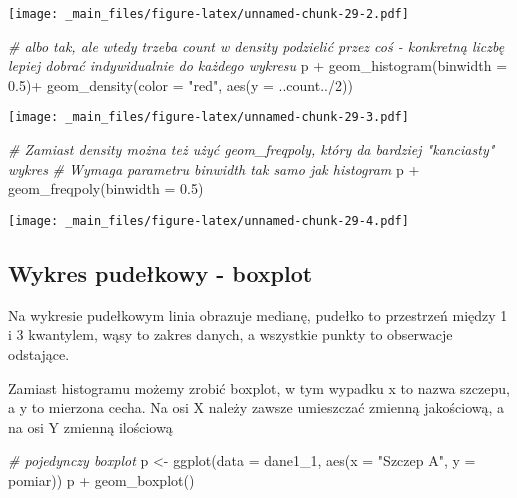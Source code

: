 \documentclass[
]{book}
\newenvironment{Shaded}{\begin{snugshade}}{\end{snugshade}}
\newcommand{\AttributeTok}[1]{\textcolor[rgb]{0.77,0.63,0.00}{#1}}
\newcommand{\CommentTok}[1]{\textcolor[rgb]{0.56,0.35,0.01}{\textit{#1}}}
\newcommand{\DecValTok}[1]{\textcolor[rgb]{0.00,0.00,0.81}{#1}}
\newcommand{\FloatTok}[1]{\textcolor[rgb]{0.00,0.00,0.81}{#1}}
\newcommand{\FunctionTok}[1]{\textcolor[rgb]{0.00,0.00,0.00}{#1}}
\newcommand{\NormalTok}[1]{#1}
\newcommand{\OtherTok}[1]{\textcolor[rgb]{0.56,0.35,0.01}{#1}}
\newcommand{\SpecialCharTok}[1]{\textcolor[rgb]{0.00,0.00,0.00}{#1}}
\newcommand{\StringTok}[1]{\textcolor[rgb]{0.31,0.60,0.02}{#1}}
\begin{document}
\texttt{[image: \_main\_files/figure-latex/unnamed-chunk-29-2.pdf]}

\begin{Shaded}
\begin{Highlighting}[]
\CommentTok{\# albo tak, ale wtedy trzeba count w density podzielić przez coś {-} konkretną liczbę lepiej dobrać indywidualnie do każdego wykresu}
\NormalTok{p }\SpecialCharTok{+} \FunctionTok{geom\_histogram}\NormalTok{(}\AttributeTok{binwidth =} \FloatTok{0.5}\NormalTok{)}\SpecialCharTok{+}
  \FunctionTok{geom\_density}\NormalTok{(}\AttributeTok{color =} \StringTok{"red"}\NormalTok{, }\FunctionTok{aes}\NormalTok{(}\AttributeTok{y =}\NormalTok{ ..count..}\SpecialCharTok{/}\DecValTok{2}\NormalTok{))}
\end{Highlighting}
\end{Shaded}

\texttt{[image: \_main\_files/figure-latex/unnamed-chunk-29-3.pdf]}

\begin{Shaded}
\begin{Highlighting}[]
\CommentTok{\# Zamiast density można też użyć geom\_freqpoly, który da bardziej "kanciasty" wykres}
\CommentTok{\# Wymaga parametru binwidth tak samo jak histogram}
\NormalTok{p }\SpecialCharTok{+} \FunctionTok{geom\_freqpoly}\NormalTok{(}\AttributeTok{binwidth =} \FloatTok{0.5}\NormalTok{)}
\end{Highlighting}
\end{Shaded}

\texttt{[image: \_main\_files/figure-latex/unnamed-chunk-29-4.pdf]}

\hypertarget{wykres-pudeux142kowy---boxplot}{%
\subsection{Wykres pudełkowy - boxplot}\label{wykres-pudeux142kowy---boxplot}}

Na wykresie pudełkowym linia obrazuje medianę, pudełko to przestrzeń między 1 i 3 kwantylem, wąsy to zakres danych, a wszystkie punkty to obserwacje odstające.

Zamiast histogramu możemy zrobić boxplot, w tym wypadku x to nazwa szczepu, a y to mierzona cecha. Na osi X należy zawsze umieszczać zmienną jakościową, a na osi Y zmienną ilościową

\begin{Shaded}
\begin{Highlighting}[]
\CommentTok{\# pojedynczy boxplot}
\NormalTok{p }\OtherTok{\textless{}{-}} \FunctionTok{ggplot}\NormalTok{(}\AttributeTok{data =}\NormalTok{ dane1\_1, }\FunctionTok{aes}\NormalTok{(}\AttributeTok{x =} \StringTok{"Szczep A"}\NormalTok{, }\AttributeTok{y =}\NormalTok{ pomiar))}
\NormalTok{p }\SpecialCharTok{+} \FunctionTok{geom\_boxplot}\NormalTok{()}
\end{Highlighting}
\end{Shaded}
\end{document}
